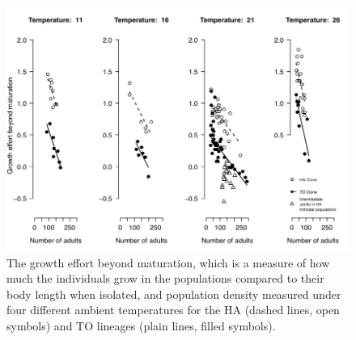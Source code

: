\begin{figure}[!ht]
\begin{center}
\includegraphics[width=\textwidth]{1_CorpsDeThese/Resumes/Fig/FIP05}
\caption[The growth effort
beyond maturation]{The growth effort
beyond maturation, which is a measure of how much the individuals grow in the
populations compared to their body length when isolated, and population density
measured under four different ambient temperatures for the HA (dashed lines,
open symbols) and TO lineages (plain lines, filled symbols).}
\label{fig:AnFIP5}
\end{center}
\end{figure}

